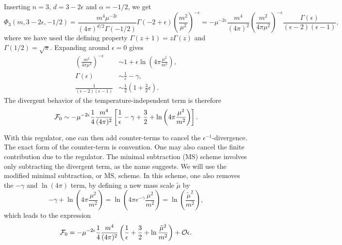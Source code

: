Inserting $n=3$, $d = 3 - 2\epsilon$ and $\alpha = -1/2$, we get
\begin{equation}
    \Phi_3(m, 3 - 2\epsilon, -1/2)
    =
    \frac{m^4 \mu^{-2\epsilon}}{(4 \pi)^{d/2}\Gamma(-1/2)} \Gamma(-2 + \epsilon) \left(\frac{m^2}{\mu^2}\right)^{-\epsilon}
    =
    - \mu^{-2\epsilon} \frac{m^4}{(4 \pi)^{2}}
    \left(\frac{m^2}{4 \pi \mu^2}\right)^{- \epsilon}
    \frac{\Gamma(\epsilon)}{(\epsilon - 2)(\epsilon - 1)},
\end{equation}
where we have used the defining property $\Gamma(z + 1) = z\Gamma(z)$ and $\Gamma(1/2) = \sqrt \pi$.
Expanding around $\epsilon = 0$ gives
\begin{align}
    \left(\frac{m^2}{4 \pi \mu^2}\right)^{- \epsilon}
    &\sim 1 + \epsilon \ln\left(4 \pi \frac{\mu^2}{m^2}\right),\\
    \Gamma(\epsilon) 
    & \sim \frac{1}{\epsilon} - \gamma, \\
    \frac{1}{(\epsilon - 2)(\epsilon - 1)}
    &\sim \frac{1}{2}\left(1 + \frac{3}{2} \epsilon\right).
\end{align}
The divergent behavior of the temperature-independent term is therefore
\begin{align}
    \mathcal{F}_0 \sim
    - \mu^{-2\epsilon} \frac{1}{4}\frac{m^4}{(4 \pi)^2}
    \left[
        \frac{1}{\epsilon} 
        - \gamma + \frac{3}{2}
        + \ln\left(4 \pi \frac{\mu^2}{m^2}\right)
    \right].
\end{align}

With this regulator, one can then add counter-terms to cancel the $\epsilon^{-1}$-divergence.
The exact form of the counter-term is convention.
One may also cancel the finite contribution due to the regulator.
The minimal subtraction ($\mathrm{MS}$) scheme involves only subtracting the divergent term, as the name suggests.
We will use the modified minimal subtraction, or $\overline{ \mathrm{MS}}$, scheme.
In this scheme, one also removes the $-\gamma$ and $\ln(4 \pi)$ term, by defining a new mass scale $\tilde \mu$ by
\begin{equation}
    \label{definition mu tilde MS bar}
    -\gamma + \ln(4\pi \frac{\mu^2}{m^2}) = \ln(4\pi e^{-\gamma} \frac{\mu^2}{m^2}) = \ln(\frac{\tilde\mu^2}{m^2}),
\end{equation}
which leads to the expression
\begin{equation}
    \label{free field regularized energy}
    \mathcal{F}_0 =
    - \mu^{-2\epsilon} \frac{1}{4}\frac{m^4}{(4 \pi)^2}
    \left(
        \frac{1}{\epsilon} 
        + \frac{3}{2}
        + \ln \frac{\tilde\mu^2}{m^2}
    \right)
    + \mathcal O{\epsilon}.
\end{equation}


